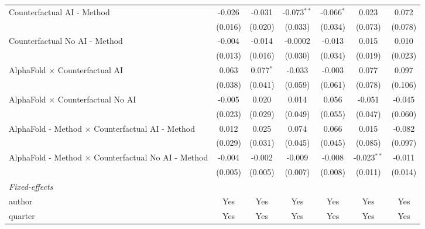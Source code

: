 \begin{tabular}{lcccccc}
   Counterfactual AI - Method                                 & -0.026      & -0.031        & -0.073$^{**}$ & -0.066$^{*}$ & 0.023         & 0.072\\   
                                                              & (0.016)     & (0.020)       & (0.033)       & (0.034)      & (0.073)       & (0.078)\\   
   Counterfactual No AI - Method                              & -0.004      & -0.014        & -0.0002       & -0.013       & 0.015         & 0.010\\   
                                                              & (0.013)     & (0.016)       & (0.030)       & (0.034)      & (0.019)       & (0.023)\\   
   AlphaFold $\times$ Counterfactual AI                       & 0.063       & 0.077$^{*}$   & -0.033        & -0.003       & 0.077         & 0.097\\   
                                                              & (0.038)     & (0.041)       & (0.059)       & (0.061)      & (0.078)       & (0.106)\\   
   AlphaFold $\times$ Counterfactual No AI                    & -0.005      & 0.020         & 0.014         & 0.056        & -0.051        & -0.045\\   
                                                              & (0.023)     & (0.029)       & (0.049)       & (0.055)      & (0.047)       & (0.060)\\   
   AlphaFold - Method $\times$ Counterfactual AI - Method     & 0.012       & 0.025         & 0.074         & 0.066        & 0.015         & -0.082\\   
                                                              & (0.029)     & (0.031)       & (0.045)       & (0.045)      & (0.085)       & (0.097)\\   
   AlphaFold - Method $\times$ Counterfactual No AI - Method  & -0.004      & -0.002        & -0.009        & -0.008       & -0.023$^{**}$ & -0.011\\   
                                                              & (0.005)     & (0.005)       & (0.007)       & (0.008)      & (0.011)       & (0.014)\\   
   \midrule
   \emph{Fixed-effects}\\
   author                                                     & Yes         & Yes           & Yes           & Yes          & Yes           & Yes\\  
   quarter                                                    & Yes         & Yes           & Yes           & Yes          & Yes           & Yes\\  

\end{tabular}
